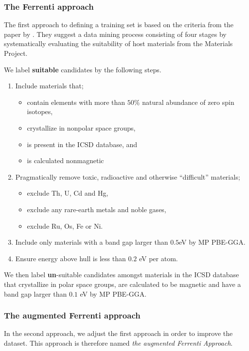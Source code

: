 \documentclass[superscriptaddress,unsortedaddress,
 amsmath,amssymb,
 aps,
]{revtex4-2}
\begin{document}
\subsubsection*{The Ferrenti approach}

The first approach to defining a training set is based on the criteria
from the paper by \citeauthor{Ferrenti2020} \cite{Ferrenti2020}.
They suggest a data mining process consisting of four stages by 
systematically evaluating the suitability of host materials from
the Materials Project.

We label \textbf{suitable} candidates by the following steps.

\begin{enumerate}
    \item Include materials that;
    \begin{itemize}
        \item contain elements with more than $50\%$ natural abundance of 
            zero spin isotopes,
        \item crystallize in nonpolar space groups,
        \item is present in the ICSD database, and
        \item is calculated nonmagnetic
    \end{itemize}
    \item Pragmatically remove toxic, radioactive and otherwise 
        ``difficult'' materials;
    \begin{itemize}
        \item exclude Th, U, Cd and Hg,
        \item exclude any rare-earth metals and noble gases,
        \item exclude Ru, Os, Fe or Ni.
    \end{itemize}
    \item Include only materials with a band gap larger than $0.5$eV by MP
        PBE-GGA.
    \item Ensure energy above hull is less than $0.2$ eV per atom.
\end{enumerate}

We then label \textbf{un}-suitable candidates amongst materials in 
the ICSD database that crystallize in polar space groups, are calculated
to be magnetic and have a band gap larger than $0.1$ eV by MP PBE-GGA.

\subsubsection*{The augmented Ferrenti approach}
In the second approach, we adjust the first approach in order to
improve the dataset. This approach is therefore named
\emph{the augmented Ferrenti Approach}.
\end{document}
